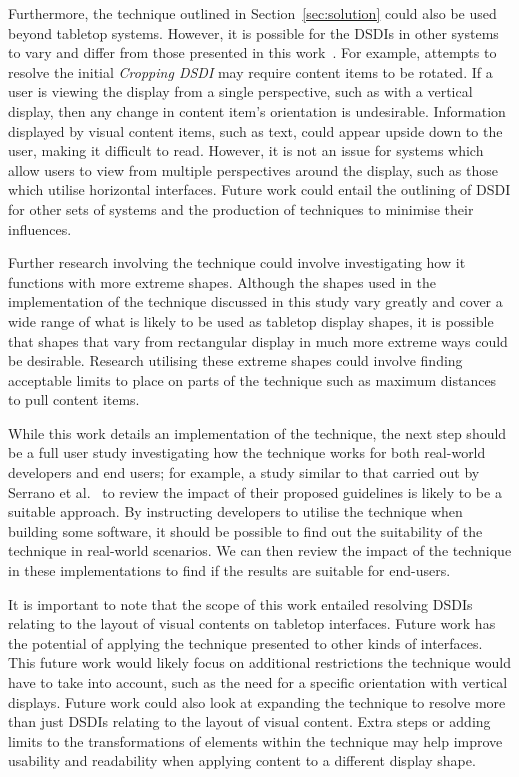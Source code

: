 \documentclass[twocolumn,compsoc]{cvm}
\begin{document}
{Furthermore, the technique outlined in Section~\ref{sec:solution} could also be used beyond tabletop systems.
However, it is possible for the \acp{DSDI} in other systems to vary and differ from those presented in this work~\cite{Serrano2017}. 
For example, attempts to resolve the initial {\emph{Cropping \ac{DSDI}}} may require content items to be rotated.
If a user is viewing the display from a single perspective, such as with a vertical display, then any change in content item's orientation is undesirable.
Information displayed by visual content items, such as text, could appear upside down to the user, making it difficult to read.
However, it is not an issue for systems which allow users to view from multiple perspectives around the display, such as those which utilise horizontal interfaces.
Future work could entail the outlining of \ac{DSDI} for other sets of systems and the production of techniques to minimise their influences.

Further research involving the technique could involve investigating how it functions with more extreme shapes.
Although the shapes used in the implementation of the technique discussed in this study vary greatly and cover a wide range of what is likely to be used as tabletop display shapes, it is possible that shapes that vary from rectangular display in much more extreme ways could be desirable.
Research utilising these extreme shapes could involve finding acceptable limits to place on parts of the technique such as maximum distances to pull content items.

While this work details an implementation of the technique, the next step should be a full user study investigating how the technique works for both real-world developers and end users; for example, a study similar to that carried out by Serrano et al.~\cite{Serrano2017} to review the impact of their proposed guidelines is likely to be a suitable approach.
By instructing developers to utilise the technique when building some software, it should be possible to find out the suitability of the technique in real-world scenarios.
We can then review the impact of the technique in these implementations to find if the results are suitable for end-users.

It is important to note that the scope of this work entailed resolving \acp{DSDI} relating to the layout of visual contents on tabletop interfaces.
Future work has the potential of applying the technique presented to other kinds of interfaces.
This future work would likely focus on additional restrictions the technique would have to take into account, such as the need for a specific orientation with vertical displays.
Future work could also look at expanding the technique to resolve more than just \acp{DSDI} relating to the layout of visual content.
Extra steps or adding limits to the transformations of elements within the technique may help improve usability and readability when applying content to a different display shape.

}
\end{document}
